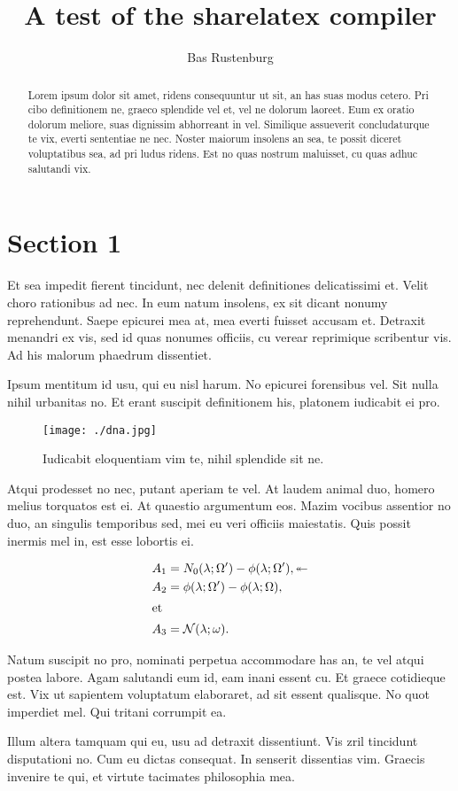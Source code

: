 \documentclass[a4paper,10pt]{article}
\title{A test of the sharelatex compiler}
\author{Bas Rustenburg}
\begin{document}
\maketitle

\begin{abstract}
Lorem ipsum dolor sit amet, ridens consequuntur ut sit, an has suas modus cetero.
Pri cibo definitionem ne, graeco splendide vel et, vel ne dolorum laoreet. \cite{rasbastenburg2014}
Eum ex oratio dolorum meliore, suas dignissim abhorreant in vel.
Similique assueverit concludaturque te vix, everti sententiae ne nec.
Noster maiorum insolens an sea, te possit diceret voluptatibus sea, ad pri ludus ridens.
Est no quas nostrum maluisset, cu quas adhuc salutandi vix.
\end{abstract}



\section{Section 1}
Et sea impedit fierent tincidunt, nec delenit definitiones delicatissimi et.
Velit choro rationibus ad nec.
In eum natum insolens, ex sit dicant nonumy reprehendunt.
Saepe epicurei mea at, mea everti fuisset accusam et.
Detraxit menandri ex vis, sed id quas nonumes officiis, cu verear reprimique scribentur vis.
Ad his malorum phaedrum dissentiet.

Ipsum mentitum id usu, qui eu nisl harum.
No epicurei forensibus vel.
Sit nulla nihil urbanitas no.
Et erant suscipit definitionem his, platonem iudicabit ei pro.

\begin{figure}[H]
 \centering
 \texttt{[image: ./dna.jpg]}
 \caption{Iudicabit eloquentiam vim te, nihil splendide sit ne.}
 \label{fig:dna}
\end{figure}

Atqui prodesset no nec, putant aperiam te vel.
At laudem animal duo, homero melius torquatos est ei.
At quaestio argumentum eos.
Mazim vocibus assentior no duo, an singulis temporibus sed, mei eu veri officiis maiestatis.
Quis possit inermis mel in, est esse lobortis ei.

\begin{align}
A_1&=N_0(\lambda;\Omega')-\phi(\lambda;\Omega'), \twoheadleftarrow \\
A_2&=\phi(\lambda;\Omega')-\phi(\lambda;\Omega),\\
\intertext{et}A_3&=\mathcal{N}(\lambda;\omega).
\end{align}

Natum suscipit no pro, nominati perpetua accommodare has an, te vel atqui postea labore. Agam salutandi eum id, eam inani essent cu. Et graece cotidieque est. Vix ut sapientem voluptatum elaboraret, ad sit essent qualisque. No quot imperdiet mel. Qui tritani corrumpit ea.

Illum altera tamquam qui eu, usu ad detraxit dissentiunt. Vis zril tincidunt disputationi no. Cum eu dictas consequat. In senserit dissentias vim. Graecis invenire te qui, et virtute tacimates philosophia mea.

{}

\end{document}
